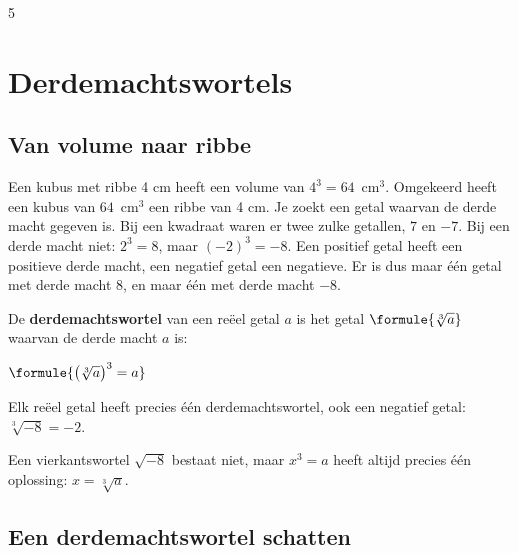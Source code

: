 \begin{alleenvoor}{5}
\section{Derdemachtswortels}

\subsection{Van volume naar ribbe}

Een kubus met ribbe 4 cm heeft een volume van $4^3 = 64$~cm$^3$. Omgekeerd heeft een kubus van $64$~cm$^3$ een ribbe van 4 cm. Je zoekt een getal waarvan de derde macht gegeven is. Bij een kwadraat waren er twee zulke getallen, $7$ en $-7$. Bij een derde macht niet: $2^3 = 8$, maar $(-2)^3 = -8$. Een positief getal heeft een positieve derde macht, een negatief getal een negatieve. Er is dus maar één getal met derde macht 8, en maar één met derde macht $-8$.

\begin{theorie}
De \textbf{\textcolor{accent}{derdemachtswortel}} van een reëel getal $a$ is het getal $\formule{\sqrt[3]{a}}$ waarvan de derde macht $a$ is:

\vspace{1mm}
\qquad $\formule{\bigl(\sqrt[3]{a}\bigr)^3 = a}$

\vspace{1mm}
Elk reëel getal heeft precies één derdemachtswortel, ook een negatief getal: $\sqrt[3]{-8} = -2$.
\end{theorie}

Een vierkantswortel $\sqrt{-8}$ bestaat niet, maar $x^3 = a$ heeft altijd precies één oplossing: $x = \sqrt[3]{a}$.


\begin{oefeningen}
\end{oefeningen}

\subsection{Een derdemachtswortel schatten}


\end{alleenvoor}
